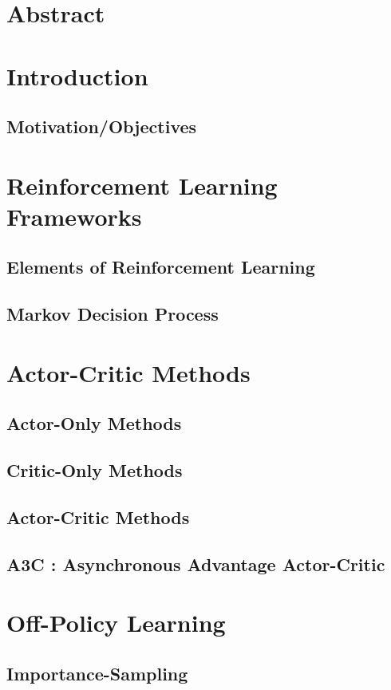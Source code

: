 \section{Abstract}

\section{Introduction}
\subsection{Motivation/Objectives}
\pagebreak

\section{Reinforcement Learning Frameworks}\raggedbottom 
\subsection{Elements of Reinforcement Learning}
\pagebreak
\subsection{Markov Decision Process} 

\pagebreak

\section{Actor-Critic Methods}\raggedbottom 
\subsection{Actor-Only Methods}
\subsection{Critic-Only Methods}
\pagebreak
\subsection{Actor-Critic Methods}
\subsection{A3C : Asynchronous Advantage Actor-Critic}
\pagebreak
\section{Off-Policy Learning}
\subsection{Importance-Sampling}
